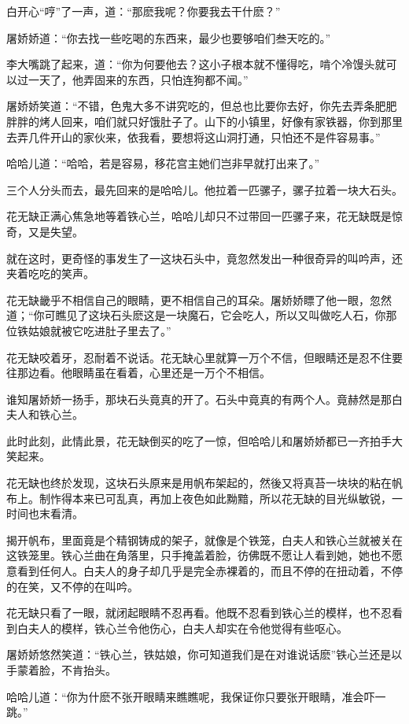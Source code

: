 \documentclass[12pt,oneside]{book}
\begin{document}
白开心``哼''了一声，道：``那麽我呢？你要我去干什麽？''

屠娇娇道：``你去找一些吃喝的东西来，最少也要够咱们叁天吃的。''

李大嘴跳了起来，道：``你为何要他去？这小子根本就不懂得吃，啃个冷馒头就可以过一天了，他弄固来的东西，只怕连狗都不闻。''

屠娇娇笑道：``不错，色鬼大多不讲究吃的，但总也比要你去好，你先去弄条肥肥胖胖的烤人回来，咱们就只好饿肚子了。山下的小镇里，好像有家铁器，你到那里去弄几件开山的家伙来，依我看，要想将这山洞打通，只怕还不是件容易事。''

哈哈儿道：``哈哈，若是容易，移花宫主她们岂非早就打出来了。''

三个人分头而去，最先回来的是哈哈儿。他拉着一匹骡子，骡子拉着一块大石头。

花无缺正满心焦急地等着铁心兰，哈哈儿却只不过带回一匹骡子来，花无缺既是惊奇，又是失望。

就在这时，更奇怪的事发生了一这块石头中，竟忽然发出一种很奇异的叫吟声，还夹着吃吃的笑声。

花无缺畿乎不相信自己的眼睛，更不相信自己的耳朵。屠娇娇瞟了他一眼，忽然道；``你可瞧见了这块石头麽这是一块魔石，它会吃人，所以又叫做吃人石，你那位铁姑娘就被它吃进肚子里去了。''

花无缺咬着牙，忍耐着不说话。花无缺心里就算一万个不信，但眼睛还是忍不住要往那边看。他眼睛虽在看着，心里还是一万个不相信。

谁知屠娇娇一扬手，那块石头竟真的开了。石头中竟真的有两个人。竟赫然是那白夫人和铁心兰。

此时此刻，此情此景，花无缺倒买的吃了一惊，但哈哈儿和屠娇娇都已一齐拍手大笑起来。

花无缺也终於发现，这块石头原来是用帆布架起的，然後又将真苔一块块的粘在帆布上。制怍得本来已可乱真，再加上夜色如此黝黯，所以花无缺的目光纵敏锐，一时间也末看清。

揭开帆布，里面竟是个精钢铸成的架子，就像是个铁笼，白夫人和铁心兰就被关在这铁笼里。铁心兰曲在角落里，只手掩盖着脸，彷佛既不愿让人看到她，她也不愿意看到任何人。白夫人的身子却几乎是完全赤裸着的，而且不停的在扭动着，不停的在笑，又不停的在叫吟。

花无缺只看了一眼，就闭起眼睛不忍再看。他既不忍看到铁心兰的模样，也不忍看到白夫人的模样，铁心兰令他伤心，白夫人却实在令他觉得有些呕心。

屠娇娇悠然笑道：``铁心兰，铁姑娘，你可知道我们是在对谁说话麽''铁心兰还是以手蒙着脸，不肯抬头。

哈哈儿道：``你为什麽不张开眼睛来瞧瞧呢，我保证你只要张开眼睛，准会吓一跳。''
\end{document}
